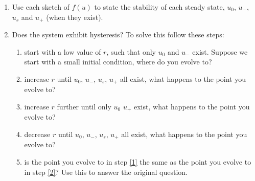 \documentclass[]{article}
\begin{document}
\begin{enumerate}
\item Use each sketch of $f(u)$ to state the stability of each steady state, $u_0$, $u_-$, $u_s$ and $u_+$ (when they exist).


\item Does the system exhibit hysteresis? To solve this follow these steps:
\begin{enumerate}
\item start with a low value of $r$, such that only $u_0$ and $u_-$  exist. Suppose we start with a small initial condition, where do you evolve to?
\item increase $r$ until $u_0$, $u_-$, $u_s$, $u_+$ all exist, what happens to the point you evolve to?\label{1}
\item increase $r$ further until only $u_0$ $u_+$ exist, what happens to the point you evolve to?
\item decrease $r$ until $u_0$, $u_-$, $u_s$, $u_+$ all exist, what happens to the point you evolve to?\label{2}
\item is the point you evolve to in step \ref{1} the same as the point you evolve to in step \ref{2}? Use this to answer the original question.
\end{enumerate} 

\end{enumerate}
\end{document}
